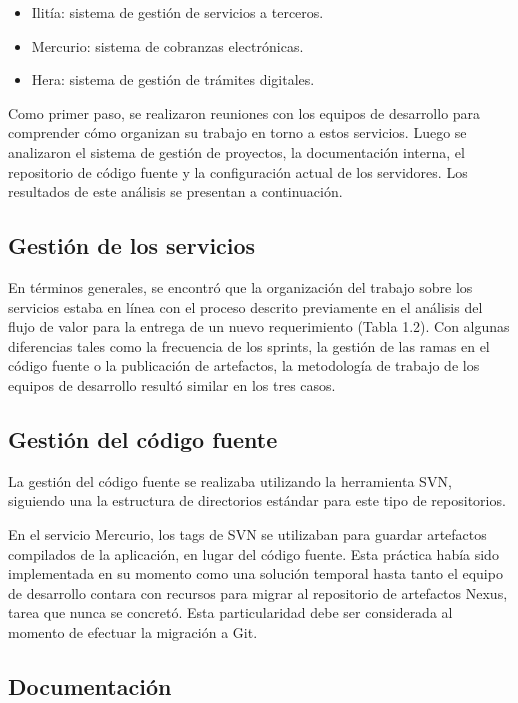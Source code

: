 \begin{itemize}
\item Ilitía: sistema de gestión de servicios a terceros.
\item Mercurio: sistema de cobranzas electrónicas.
\item Hera: sistema de gestión de trámites digitales.
\end{itemize}
Como primer paso, se realizaron reuniones con los equipos de
desarrollo para comprender cómo organizan su trabajo en torno a estos
servicios. Luego se analizaron el sistema de gestión de proyectos, la
documentación interna, el repositorio de código fuente y la
configuración actual de los servidores. Los resultados de este
análisis se presentan a continuación.

\subsection{Gestión de los servicios}

En términos generales, se encontró que la organización del trabajo
sobre los servicios estaba en línea con el proceso descrito
previamente en el análisis del flujo de valor para la entrega de un
nuevo requerimiento (Tabla 1.2). Con algunas diferencias tales como la
frecuencia de los sprints, la gestión de las ramas en el código fuente
o la publicación de artefactos, la metodología de trabajo de los
equipos de desarrollo resultó similar en los tres casos.

\subsection{Gestión del código fuente}

La gestión del código fuente se realizaba utilizando la herramienta
SVN, siguiendo una la estructura de directorios
 estándar para este tipo de repositorios.

En el servicio Mercurio, los tags de SVN se utilizaban para guardar
artefactos compilados de la aplicación, en lugar del código
fuente. Esta práctica había sido implementada en su momento como una
solución temporal hasta tanto el equipo de desarrollo contara con
recursos para migrar al repositorio de artefactos Nexus, tarea que
nunca se concretó. Esta particularidad debe ser considerada al momento
de efectuar la migración a Git.

\subsection{Documentación}

